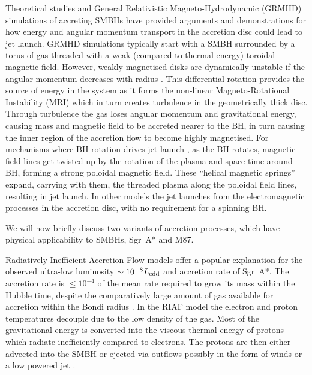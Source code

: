 Theoretical studies and General Relativistic {Magneto-Hydrodynamic (GRMHD)} simulations of accreting SMBHs \citep[e.g.][]{Penrose_1969, Blandford_1977, Blandford_1982,Gammie_2003,Narayan_2012,Moscibrodzka_2013} have provided arguments and demonstrations for how energy and angular momentum transport in the accretion disc could lead to jet launch. GRMHD simulations typically start with a SMBH surrounded by a torus of gas threaded with a weak (compared to thermal energy) toroidal magnetic field. However, weakly magnetised disks are dynamically unstable if the angular momentum decreases with radius \citep{Balbus_1998}. This differential rotation provides the source of energy in the system as it forms the non-linear Magneto-Rotational Instability (MRI) which in turn creates turbulence in the geometrically thick disc. Through turbulence the gas loses angular momentum and gravitational energy, causing mass and magnetic field to be accreted nearer to the BH, in turn causing the inner region of the accretion flow to become highly magnetised. For mechanisms where BH rotation drives jet launch \citep[e.g.][]{Penrose_1969}, as the BH rotates, magnetic field lines get twisted up by the rotation of the plasma and space-time around BH, forming a strong poloidal magnetic  field. These ``helical magnetic springs'' \citep{Narayan_2014} expand, carrying with them, the threaded plasma along the poloidal field lines, resulting in jet launch. In other models \citep[e.g.][]{Blandford_1977, Blandford_1982} the jet launches from the electromagnetic processes in the accretion disc, with no requirement for a spinning BH. 


We will now briefly discuss two variants of accretion processes, which have physical applicability to SMBHs, Sgr~A* and M87.
 
Radiatively Inefficient Accretion Flow \citep[(RIAF),][]{Narayan_1995,Yuan_2003} models offer a popular explanation for the observed ultra-low luminosity $\sim 10^{-8} L_{\rm edd}$ and accretion rate of Sgr~A*. The accretion rate is $\le 10^{-4}$ of the mean rate required to grow its mass within the Hubble time, despite the comparatively large amount of gas available for accretion within the Bondi radius \citep{Goddi_2016}. In the RIAF model the electron and proton temperatures decouple due to the low density of the gas. Most of the gravitational energy is converted into the viscous thermal energy of protons which radiate inefficiently compared to electrons. The protons are then either advected into the SMBH \citep{Narayan_1998} or ejected via outflows possibly in the form of winds or a low powered jet \citep{Blandford_1999}. 


